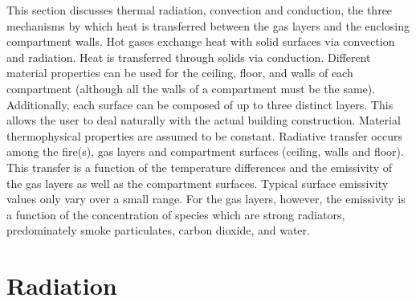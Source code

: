 This section discusses thermal radiation, convection and conduction, the three mechanisms by which heat is transferred between the gas layers and the enclosing compartment walls. Hot gases exchange heat with solid surfaces via convection and radiation. Heat is transferred through solids via conduction. Different material properties can be used for the ceiling, floor, and walls of each compartment (although all the walls of a compartment must be the same).  Additionally, each surface can be composed of up to three distinct layers.  This allows the user to deal naturally with the actual building construction.  Material thermophysical properties are assumed to be constant. Radiative transfer occurs among the fire(s), gas layers and compartment surfaces (ceiling, walls and floor).  This transfer is a function of the temperature differences and the emissivity of the gas layers as well as the compartment surfaces.  Typical surface emissivity values only vary over a small range.  For the gas layers, however, the emissivity is a function of the concentration of species which are strong radiators, predominately smoke particulates, carbon dioxide, and water.

\section{Radiation}
\label{sec:Radiation}

